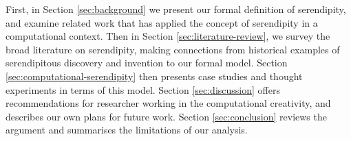 First, in Section \ref{sec:background} we present our formal
definition of serendipity, and examine related work that has applied
the concept of serendipity in a computational context.  Then in
Section \ref{sec:literature-review}, we survey the broad literature on
serendipity, making connections from historical examples of
serendipitous discovery and invention to our formal model.  Section
\ref{sec:computational-serendipity} then presents case studies and
thought experiments in terms of this model.  Section
\ref{sec:discussion} offers recommendations for researcher working in
the computational creativity, and describes our own plans for future
work.  Section \ref{sec:conclusion} reviews the argument and
summarises the limitations of our analysis.



